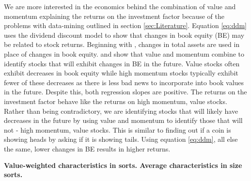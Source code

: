 We are more interested in the economics behind the combination of value and momentum
explaining the returns on the investment factor because of the problems with data-mining
outlined in section \ref{sec:Literature}. Equation \ref{eq:ddm} uses the dividend discount
model to show that changes in book equity (BE) may be related to stock returns. Beginning
with \parencite{fama2006profitability}, changes in total assets are used in place of
changes in book equity. \textcite{kok2017facts} and \textcite{asness2013devil} show that
value and momentum combine to identify stocks that will exhibit changes in BE in the
future. Value stocks often exhibit decreases in book equity while high momentum stocks
typically exhibit fewer of these decreases as there is less bad news to incorporate into
book values in the future. Despite this, both regression slopes are positive. The returns
on the investment factor behave like the returns on high momentum, value stocks. Rather
than being contradictory, we are identifying stocks that will likely have decreases in the
future by using value and momentum to identify those that will not - high momentum, value
stocks. This is similar to finding out if a coin is showing heads by asking if it is
showing tails. Using equation \ref{eq:ddm}, all else the same, lower changes in BE results
in higher returns.


\textbf{Value-weighted characteristics in sorts. Average characteristics in size sorts.}
